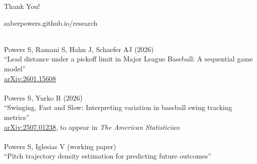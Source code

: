\documentclass{beamer}
\begin{document}
  \begin{frame}{Thank You!}
    \begin{center}
      saberpowers.github.io\alert{/research}\\
    \end{center}
    \small
    ~\\
    Powers S, Ramani S, Hahn J, Schaefer AJ (2026)\\
    ``Lead distance under a pickoff limit in Major League Baseball: A sequential game model''\\
    \href{https://arxiv.org/abs/2601.15608}{arXiv:2601.15608}\\
    ~\\
    Powers S, Yurko R (2026)\\
    ``Swinging, Fast and Slow: Interpreting variation in baseball swing tracking metrics''\\
    \href{https://arxiv.org/abs/2507.01238}{arXiv:2507.01238}, to appear in {\it The American Statistician}\\
    ~\\
    Powers S, Iglesias V (working paper)\\
    ``Pitch trajectory density estimation for predicting future outcomes''
  \end{frame}
\end{document}
